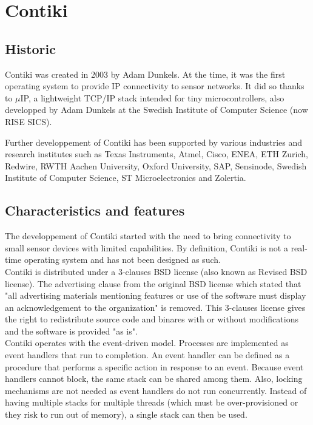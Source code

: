 \section{Contiki}

\subsection{Historic}
Contiki was created in 2003 by Adam Dunkels. %
At the time, it was the first operating system to provide IP connectivity to sensor networks.
It did so thanks to $\mu$IP, a lightweight TCP/IP stack intended for tiny microcontrollers,
    also developped by Adam Dunkels at the Swedish Institute of Computer Science (now RISE SICS).%

Further developpement of Contiki has been supported by various industries and research institutes 
    such as Texas Instruments, Atmel, Cisco, ENEA, ETH Zurich, Redwire, RWTH Aachen University, 
    Oxford University, SAP, Sensinode, Swedish Institute of Computer Science, ST Microelectronics and Zolertia.

\subsection{Characteristics and features}
The developpement of Contiki started with the need to bring connectivity to small sensor devices with limited capabilities.
By definition, Contiki is not a real-time operating system and has not been designed as such.\\

Contiki is distributed under a 3-clauses BSD license (also known as Revised BSD license).
The advertising clause from the original BSD license which stated that "all advertising materials mentioning features or use of the software
must display an acknowledgement to the organization" is removed.
This 3-clauses license gives the right to redistribute source code and binares with or without modifications
    and the software is provided "as is".\\

Contiki operates with the event-driven model.
Processes are implemented as event handlers that run to completion.
An event handler can be defined as a procedure that performs a specific action in response to an event.
Because event handlers cannot block, the same stack can be shared among them.
Also, locking mechanisms are not needed as event handlers do not run concurrently.
Instead of having multiple stacks for multiple threads (which must be over-provisioned or they risk to run out of memory), a single stack can then be used.

